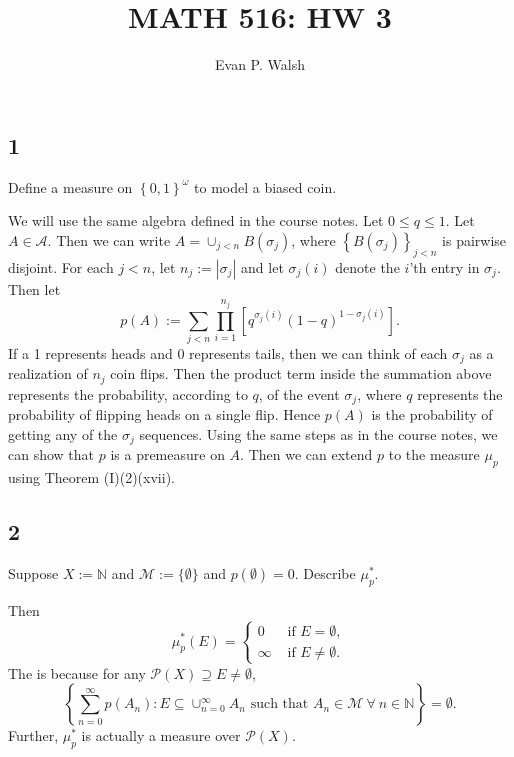 \documentclass[12pt]{article}
\title{MATH 516: HW 3}
\author{Evan P. Walsh}
\begin{document}
\maketitle

\subsection*{1}
\begin{tcolorbox}
Define a measure on $\left\{ 0,1 \right\}^{\omega}$ to model a biased coin.
\end{tcolorbox}

We will use the same algebra defined in the course notes. Let $0 \leq q \leq 1$. Let $A \in \mathcal{A}$. Then we can write $A = \cup_{j <
n}B(\sigma_{j})$, where $\left\{ B(\sigma_{j}) \right\}_{j < n}$ is pairwise disjoint. For each $j < n$, let $n_{j} := |\sigma_{j}|$ and let
$\sigma_{j}(i)$ denote the $i$'th entry in $\sigma_{j}$. Then let 
\[ p(A) := \sum_{j < n}\prod_{i=1}^{n_{j}}\left[ q^{\sigma_{j}(i)}(1-q)^{1-\sigma_{j}(i)} \right]. \]
If a 1 represents heads and 0 represents tails, then we can think of each $\sigma_{j}$ as a realization of $n_{j}$ coin flips. Then the product term inside
the summation above represents the probability, according to $q$, of the event $\sigma_{j}$, where $q$ represents the probability of flipping heads on
a single flip. Hence $p(A)$ is the probability of getting any of the $\sigma_{j}$ sequences. Using the same steps as in the course notes, we can show
that $p$ is a premeasure on $A$. Then we can extend $p$ to the measure $\mu_{p}$ using Theorem (I)(2)(xvii).



\subsection*{2}
\begin{tcolorbox}
Suppose $X := \mathbb{N}$ and $\mathcal{M} := \{\emptyset\}$ and $p(\emptyset) = 0$. Describe $\mu_{p}^{*}$.
\end{tcolorbox}

Then 
\[ \mu_{p}^{*}(E) = \left\{ \begin{array}{cl}
0 & \text{ if } E = \emptyset, \\
\infty & \text{ if } E \neq \emptyset.
\end{array} \right. \]
The is because for any $\mathcal{P}(X) \supseteq E \neq \emptyset$, 
\[ \left\{ \sum_{n=0}^{\infty}p(A_{n}) : E \subseteq \cup_{n=0}^{\infty}A_{n} \text{ such that } A_{n} \in \mathcal{M}\ \forall \ n \in \mathbb{N}
\right\} = \emptyset. \]
Further, $\mu_{p}^{*}$ is actually a measure over $\mathcal{P}(X)$.
\end{document}
